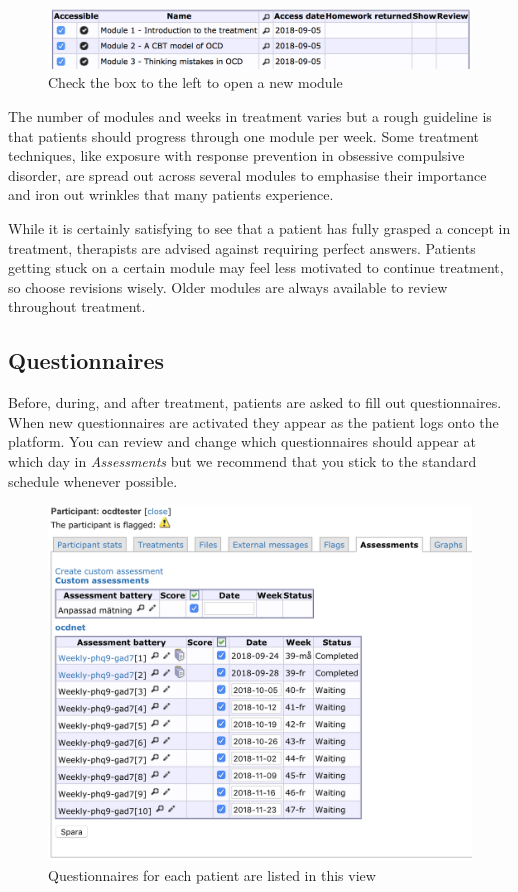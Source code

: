 \documentclass[]{book}
\theoremstyle{definition}
\theoremstyle{definition}
\theoremstyle{definition}
\theoremstyle{remark}
\begin{document}
\begin{figure}
\centering
\includegraphics{images/module-access.png}
\caption{Check the box to the left to open a new module}
\end{figure}

The number of modules and weeks in treatment varies but a rough
guideline is that patients should progress through one module per week.
Some treatment techniques, like exposure with response prevention in
obsessive compulsive disorder, are spread out across several modules to
emphasise their importance and iron out wrinkles that many patients
experience.

While it is certainly satisfying to see that a patient has fully grasped
a concept in treatment, therapists are advised against requiring perfect
answers. Patients getting stuck on a certain module may feel less
motivated to continue treatment, so choose revisions wisely. Older
modules are always available to review throughout treatment.

\hypertarget{questionnaires}{%
\subsection{Questionnaires}\label{questionnaires}}

Before, during, and after treatment, patients are asked to fill out
questionnaires. When new questionnaires are activated they appear as the
patient logs onto the platform. You can review and change which
questionnaires should appear at which day in \emph{Assessments} but we
recommend that you stick to the standard schedule whenever possible.

\begin{figure}
\centering
\includegraphics{images/assessments-list.png}
\caption{Questionnaires for each patient are listed in this view}
\end{figure}
\end{document}
